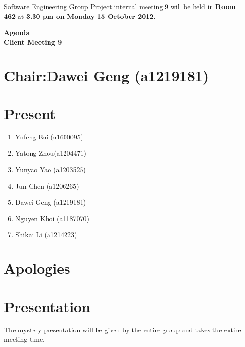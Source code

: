 \documentclass[11pt, a4paper]{article}
\begin{document}
\noindent Software Engineering Group Project internal meeting 9 will be held in {\bf Room 462} at {\bf 3.30 pm on Monday 15 October 2012}.


\vspace*{15pt}

\begin{center}
\huge \bf Agenda \\Client Meeting 9
\end{center}



\section*{Chair:Dawei Geng (a1219181)}
\section*{Present}
\begin{enumerate}
\item Yufeng Bai (a1600095)
\item Yatong Zhou(a1204471)
\item Yunyao Yao (a1203525)
\item Jun Chen (a1206265)
\item Dawei Geng (a1219181)
\item Nguyen Khoi (a1187070)
\item Shikai Li (a1214223)
\end{enumerate}
\section{Apologies}

\section{Presentation}
The mystery presentation will be given by the entire group and takes the entire meeting time.

\end{document}
